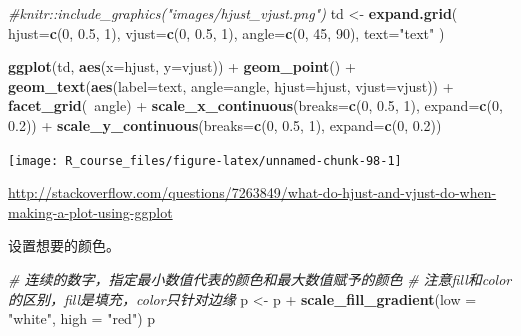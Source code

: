 \documentclass[]{article}
\newenvironment{Shaded}{\begin{snugshade}}{\end{snugshade}}
\newcommand{\KeywordTok}[1]{\textcolor[rgb]{0.13,0.29,0.53}{\textbf{{#1}}}}
\newcommand{\DataTypeTok}[1]{\textcolor[rgb]{0.13,0.29,0.53}{{#1}}}
\newcommand{\DecValTok}[1]{\textcolor[rgb]{0.00,0.00,0.81}{{#1}}}
\newcommand{\FloatTok}[1]{\textcolor[rgb]{0.00,0.00,0.81}{{#1}}}
\newcommand{\StringTok}[1]{\textcolor[rgb]{0.31,0.60,0.02}{{#1}}}
\newcommand{\CommentTok}[1]{\textcolor[rgb]{0.56,0.35,0.01}{\textit{{#1}}}}
\newcommand{\NormalTok}[1]{{#1}}
\numberwithin{figure}{section}
\numberwithin{table}{section}
\theoremstyle{definition}
\theoremstyle{definition}
\theoremstyle{definition}
\theoremstyle{remark}
\begin{document}
\begin{Shaded}
\begin{Highlighting}[]
\CommentTok{#knitr::include_graphics("images/hjust_vjust.png")}
\NormalTok{td <-}\StringTok{ }\KeywordTok{expand.grid}\NormalTok{(}
    \DataTypeTok{hjust=}\KeywordTok{c}\NormalTok{(}\DecValTok{0}\NormalTok{, }\FloatTok{0.5}\NormalTok{, }\DecValTok{1}\NormalTok{),}
    \DataTypeTok{vjust=}\KeywordTok{c}\NormalTok{(}\DecValTok{0}\NormalTok{, }\FloatTok{0.5}\NormalTok{, }\DecValTok{1}\NormalTok{),}
    \DataTypeTok{angle=}\KeywordTok{c}\NormalTok{(}\DecValTok{0}\NormalTok{, }\DecValTok{45}\NormalTok{, }\DecValTok{90}\NormalTok{),}
    \DataTypeTok{text=}\StringTok{"text"}
\NormalTok{)}

\KeywordTok{ggplot}\NormalTok{(td, }\KeywordTok{aes}\NormalTok{(}\DataTypeTok{x=}\NormalTok{hjust, }\DataTypeTok{y=}\NormalTok{vjust)) +}\StringTok{ }
\StringTok{    }\KeywordTok{geom_point}\NormalTok{() +}
\StringTok{    }\KeywordTok{geom_text}\NormalTok{(}\KeywordTok{aes}\NormalTok{(}\DataTypeTok{label=}\NormalTok{text, }\DataTypeTok{angle=}\NormalTok{angle, }\DataTypeTok{hjust=}\NormalTok{hjust, }\DataTypeTok{vjust=}\NormalTok{vjust)) +}\StringTok{ }
\StringTok{    }\KeywordTok{facet_grid}\NormalTok{(~angle) +}
\StringTok{    }\KeywordTok{scale_x_continuous}\NormalTok{(}\DataTypeTok{breaks=}\KeywordTok{c}\NormalTok{(}\DecValTok{0}\NormalTok{, }\FloatTok{0.5}\NormalTok{, }\DecValTok{1}\NormalTok{), }\DataTypeTok{expand=}\KeywordTok{c}\NormalTok{(}\DecValTok{0}\NormalTok{, }\FloatTok{0.2}\NormalTok{)) +}
\StringTok{    }\KeywordTok{scale_y_continuous}\NormalTok{(}\DataTypeTok{breaks=}\KeywordTok{c}\NormalTok{(}\DecValTok{0}\NormalTok{, }\FloatTok{0.5}\NormalTok{, }\DecValTok{1}\NormalTok{), }\DataTypeTok{expand=}\KeywordTok{c}\NormalTok{(}\DecValTok{0}\NormalTok{, }\FloatTok{0.2}\NormalTok{))}
\end{Highlighting}
\end{Shaded}

\begin{center}\texttt{[image: R\_course\_files/figure-latex/unnamed-chunk-98-1]} \end{center}

\url{http://stackoverflow.com/questions/7263849/what-do-hjust-and-vjust-do-when-making-a-plot-using-ggplot}

设置想要的颜色。

\begin{Shaded}
\begin{Highlighting}[]
\CommentTok{# 连续的数字，指定最小数值代表的颜色和最大数值赋予的颜色}
\CommentTok{# 注意fill和color的区别，fill是填充，color只针对边缘}
\NormalTok{p <-}\StringTok{ }\NormalTok{p +}\StringTok{ }\KeywordTok{scale_fill_gradient}\NormalTok{(}\DataTypeTok{low =} \StringTok{"white"}\NormalTok{, }\DataTypeTok{high =} \StringTok{"red"}\NormalTok{)}
\NormalTok{p}
\end{Highlighting}
\end{Shaded}
\end{document}
